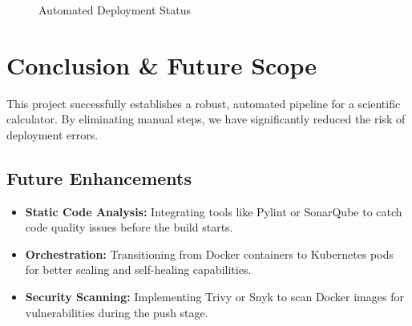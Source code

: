 \documentclass[12pt]{article}
\begin{document}
\vspace{1cm}
\begin{figure}[h]
    \centering
    \caption{Automated Deployment Status}
\end{figure}

\section{Conclusion \& Future Scope}
This project successfully establishes a robust, automated pipeline for a scientific calculator. By eliminating manual steps, we have significantly reduced the risk of deployment errors.

\subsection{Future Enhancements}
\begin{itemize}
    \item \textbf{Static Code Analysis:} Integrating tools like Pylint or SonarQube to catch code quality issues before the build starts.
    \item \textbf{Orchestration:} Transitioning from Docker containers to Kubernetes pods for better scaling and self-healing capabilities.
    \item \textbf{Security Scanning:} Implementing Trivy or Snyk to scan Docker images for vulnerabilities during the push stage.
\end{itemize}
\end{document}
